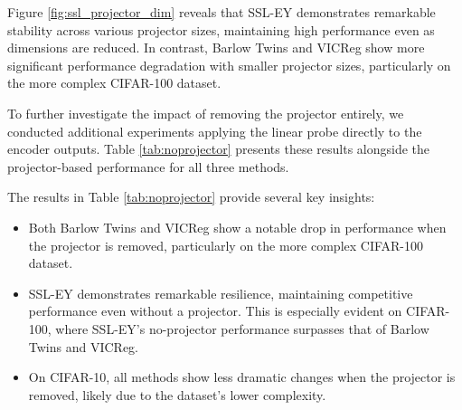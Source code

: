 Figure \ref{fig:ssl_projector_dim} reveals that SSL-EY demonstrates remarkable stability across various projector sizes, maintaining high performance even as dimensions are reduced. In contrast, Barlow Twins and VICReg show more significant performance degradation with smaller projector sizes, particularly on the more complex CIFAR-100 dataset.

To further investigate the impact of removing the projector entirely, we conducted additional experiments applying the linear probe directly to the encoder outputs. Table \ref{tab:noprojector} presents these results alongside the projector-based performance for all three methods.

\begin{table}[H]
    \centering
    \caption{Comparison of SSL method performance with and without projector on CIFAR-10 and CIFAR-100 datasets.}
    \label{tab:noprojector}
\end{table}

The results in Table \ref{tab:noprojector} provide several key insights:

\begin{itemize}
    \item Both Barlow Twins and VICReg show a notable drop in performance when the projector is removed, particularly on the more complex CIFAR-100 dataset.
    \item SSL-EY demonstrates remarkable resilience, maintaining competitive performance even without a projector. This is especially evident on CIFAR-100, where SSL-EY's no-projector performance surpasses that of Barlow Twins and VICReg.
    \item On CIFAR-10, all methods show less dramatic changes when the projector is removed, likely due to the dataset's lower complexity.
\end{itemize}

